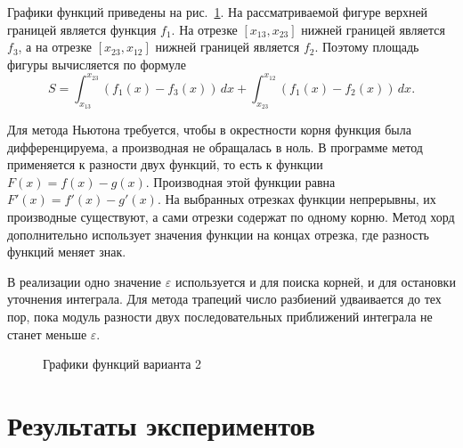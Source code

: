 \documentclass[a4paper,12pt,titlepage,finall]{article}
\begin{document}
Графики функций приведены на рис.~\ref{plot1}. На рассматриваемой фигуре верхней границей является функция \(f_1\). На отрезке \([x_{13},x_{23}]\) нижней границей является \(f_3\), а на отрезке \([x_{23},x_{12}]\) нижней границей является \(f_2\). Поэтому площадь фигуры вычисляется по формуле
\[
    S=\int_{x_{13}}^{x_{23}}\left(f_1(x)-f_3(x)\right)\,dx+
      \int_{x_{23}}^{x_{12}}\left(f_1(x)-f_2(x)\right)\,dx.
\]

Для метода Ньютона требуется, чтобы в окрестности корня функция была дифференцируема, а производная не обращалась в ноль. В программе метод применяется к разности двух функций, то есть к функции \(F(x)=f(x)-g(x)\). Производная этой функции равна \(F'(x)=f'(x)-g'(x)\). На выбранных отрезках функции непрерывны, их производные существуют, а сами отрезки содержат по одному корню. Метод хорд дополнительно использует значения функции на концах отрезка, где разность функций меняет знак.

В реализации одно значение \(\varepsilon\) используется и для поиска корней, и для остановки уточнения интеграла. Для метода трапеций число разбиений удваивается до тех пор, пока модуль разности двух последовательных приближений интеграла не станет меньше \(\varepsilon\).

\begin{figure}[H]
\centering
{}
\caption{Графики функций варианта 2}
\label{plot1}
\end{figure}


\clearpage

\section{Результаты экспериментов}
\end{document}
